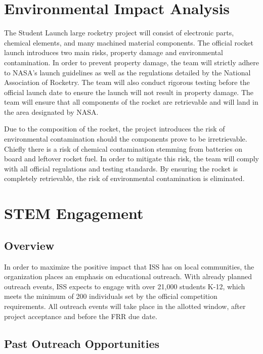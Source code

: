 \chapter{Environmental Impact Analysis}

The Student Launch large rocketry project will consist of electronic parts, chemical elements, and many machined material components. The official rocket launch introduces two main risks, property damage and environmental contamination. In order to prevent property damage, the team will strictly adhere to NASA’s launch guidelines as well as the regulations detailed by the National Association of Rocketry. The team will also conduct rigorous testing before the official launch date to ensure the launch will not result in property damage. The team will ensure that all components of the rocket are retrievable and will land in the area designated by NASA.

Due to the composition of the rocket, the project introduces the risk of environmental contamination should the components prove to be irretrievable. Chiefly there is a risk of chemical contamination stemming from batteries on board and leftover rocket fuel. In order to mitigate this risk, the team will comply with all official regulations and testing standards. By ensuring the rocket is completely retrievable, the risk of environmental contamination is eliminated.

\chapter{STEM Engagement}

\section{Overview}

In order to maximize the positive impact that ISS has on local communities, the organization places an emphasis on educational outreach. With already planned outreach events, ISS expects to engage with over 21,000 students K-12, which meets the minimum of 200 individuals set by the official competition requirements. All outreach events will take place in the allotted window, after project acceptance and before the FRR due date.

\section{Past Outreach Opportunities}

